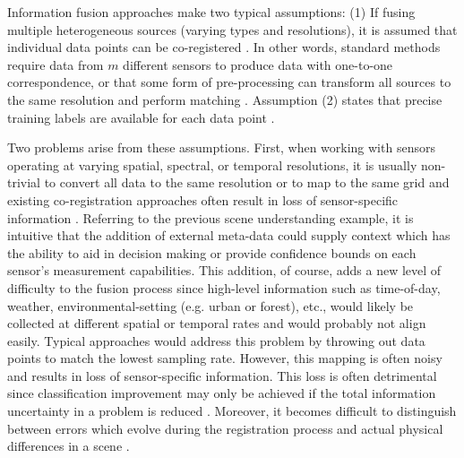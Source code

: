 Information fusion approaches make two typical assumptions: (1) If fusing multiple heterogeneous sources (varying types and resolutions), it is assumed that individual data points can be co-registered \cite{Shen2016SpatioTemporalSpectralFusion}. In other words, standard methods require data from $m$ different sensors to produce data with one-to-one correspondence, or that some form of pre-processing can transform all sources to the same resolution and perform matching \cite{hackett1990multisensorfusion,Butenuth2007HeterogeneousGeospatialData}.  Assumption (2) states that precise training labels are available for each data point \cite{Du2017Thesis}. 
\newline 

Two problems arise from these assumptions.  First, when working with sensors operating at varying spatial, spectral, or temporal resolutions, it is usually non-trivial to convert all data to the same resolution or to map to the same grid and existing co-registration approaches often result in loss of sensor-specific information \cite{Shen2016SpatioTemporalSpectralFusion,Brigot2016CoregistrationForestRemoteSensingImages}.  Referring to the previous scene understanding example, it is intuitive that the addition of external meta-data could supply context which has the ability to aid in decision making or provide confidence bounds on each sensor's measurement capabilities.  This addition, of course, adds a new level of difficulty to the fusion process since high-level information such as time-of-day, weather, environmental-setting (e.g. urban or forest), etc., would likely be collected at different spatial or temporal rates and would probably not align easily.  Typical approaches would address this problem by throwing out data points to match the lowest sampling rate.  However, this mapping is often noisy and results in loss of sensor-specific information.  This loss is often detrimental since classification improvement may only be achieved if the total information uncertainty in a problem is reduced \cite{Ruta2000OverviewClassifierFusionMethods}.  Moreover, it becomes difficult to distinguish between errors which evolve during the registration process and actual physical differences in a scene \cite{Zitova2003SurveyImageRegistrationMethods}.
\newline 

